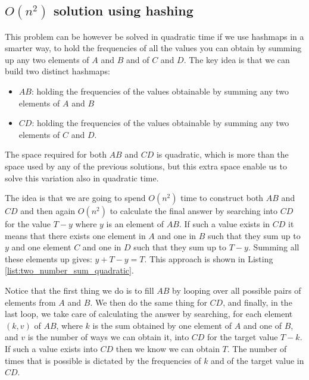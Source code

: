 \subsection{$O(n^2)$ solution using hashing}

This problem can be however be solved in quadratic time if we use hashmaps in a smarter way, to hold 
the frequencies of all the values you can obtain by summing up any two elements of $A$ and $B$ and of $C$ and $D$.
The key idea is that we can build two distinct hashmaps:
\begin{itemize}
	\item $AB$: holding the frequencies of the values obtainable by summing any two elements of $A$ and $B$
	\item $CD$: holding the frequencies of the values obtainable by summing any two elements of $C$ and $D$.
\end{itemize}

The space required for both $AB$ and $CD$ is quadratic, which is more than the space used by any of the previous solutions, but this extra space
enable us to solve this variation also in quadratic time. 

The idea is that we are going to spend $O(n^2)$ time to construct both $AB$ and $CD$
and then again $O(n^2)$ to calculate the final answer 
by searching into $CD$ for the value $T-y$ where $y$ is an element of $AB$. 
If such a value exists in $CD$ it means that there exists one element in  $A$ and one in $B$ such that they sum up to $y$ and
one element $C$ and one in $D$ such that they sum up to $T-y$. Summing all these elements up gives: $y+T-y = T$.
This approach is shown in Listing \ref{list:two_number_sum_quadratic}. 



Notice that the first thing we do is to fill $AB$ by looping over all possible pairs of elements from $A$ and $B$.
We then do the same thing for $CD$, and finally, in the last loop, we take care of calculating the answer by searching, for each element $(k,v)$ of $AB$, where $k$ is the sum obtained by one element of $A$ and one of $B$, and $v$ is the number of ways we can obtain it,
into $CD$ for the target value $T-k$. If such a value exists into $CD$ then we know we can obtain $T$. The number of times
that is possible is dictated by the frequencies of $k$ and of the target value in $CD$.

